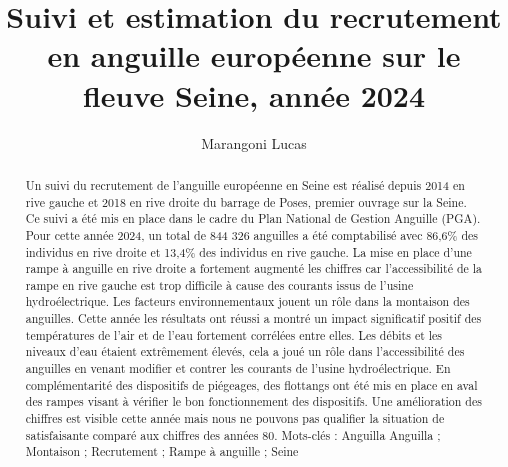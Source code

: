 \documentclass[11pt,titlepage,twoside]{article}\usepackage[]{graphicx}\usepackage[table]{xcolor}
\title{Suivi et estimation du recrutement en anguille européenne sur le fleuve Seine,
année 2024}
\author[1]{Marangoni Lucas}
\affil[1]{Seine-Normandie Migrateurs, 11 cours Clemenceau 76100 Rouen}
\begin{document}
\hypersetup{pageanchor=false}

\begin{titlepage}



\end{titlepage}



\newpage
\thispagestyle{empty}
\strut
\newpage

 \setcounter{page}{1}

\maketitle

\begin{abstract}


Un suivi du recrutement de l’anguille européenne en Seine est réalisé depuis 2014 en rive gauche et 2018 en rive droite du barrage de Poses, premier ouvrage sur la Seine. Ce suivi a été mis en place dans le cadre du Plan National de Gestion Anguille (PGA). Pour cette année 2024, un total de 844 326 anguilles a été comptabilisé avec 86,6\% des individus en rive droite et 13,4\% des individus en rive gauche. La mise en place d’une rampe à anguille en rive droite a fortement augmenté les chiffres car l’accessibilité de la rampe en rive gauche est trop difficile à cause des courants issus de l’usine hydroélectrique. Les facteurs environnementaux jouent un rôle dans la montaison des anguilles. Cette année les résultats ont réussi a montré un impact significatif positif des températures de l’air et de l’eau fortement corrélées entre elles. Les débits et les niveaux d’eau étaient extrêmement élevés, cela a joué un rôle dans l’accessibilité des anguilles en venant modifier et contrer les courants de l’usine hydroélectrique. En complémentarité des dispositifs de piégeages, des flottangs ont été mis en place en aval des rampes visant à vérifier le bon fonctionnement des dispositifs. Une amélioration des chiffres est visible cette année mais nous ne pouvons pas qualifier la situation de satisfaisante comparé aux chiffres des années 80.
Mots-clés :  Anguilla Anguilla ; Montaison ; Recrutement ; Rampe à anguille ; Seine


\end{abstract}

\newpage

\tableofcontents

\clearpage

\listoffigures
\end{document}
